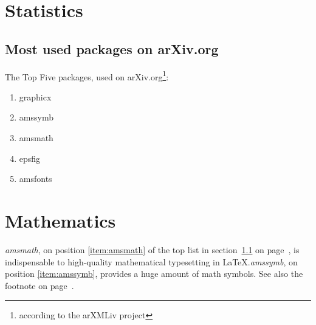 \documentclass{book}
\begin{document}
\tableofcontents
\chapter{Statistics}
\section{Most used packages on arXiv.org}\label{sec:packages}
The Top Five packages, used on arXiv.org\footnote{according
to the arXMLiv project\label{fn:project}}:
\begin{enumerate}
\item graphicx
\item amssymb \label{item:amssymb}
\item amsmath \label{item:amsmath}
\item epsfig
\item amsfonts
\end{enumerate}
\chapter{Mathematics}
\emph{amsmath}, on position \ref{item:amsmath} of the top list
in section~\ref{sec:packages} on page~\pageref{sec:packages},
is indispensable to high-quality mathematical typesetting in
\LaTeX.\emph{amssymb}, on position \ref{item:amssymb},
provides a huge amount of math symbols.
See also the footnote on page~\pageref{fn:project}.
\end{document}
